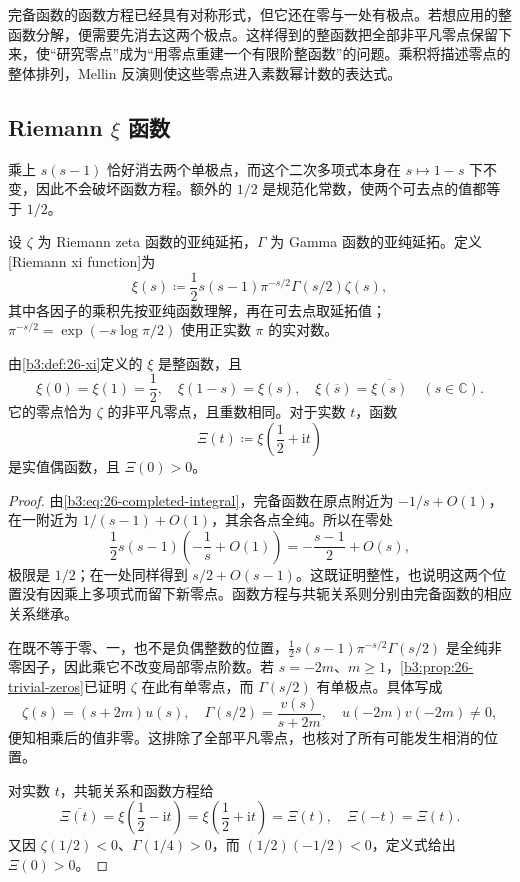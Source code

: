 
完备函数的函数方程已经具有对称形式，但它还在零与一处有极点。若想应用的整函数分解，便需要先消去这两个极点。这样得到的整函数把全部非平凡零点保留下来，使“研究零点”成为“用零点重建一个有限阶整函数”的问题。乘积将描述零点的整体排列，Mellin 反演则使这些零点进入素数幂计数的表达式。

\subsection{Riemann \texorpdfstring{\(\xi\)}{\AnalysisPdfXi} 函数}
\label{b3:subsec:260601}

乘上 \(s(s-1)\) 恰好消去两个单极点，而这个二次多项式本身在 \(s\mapsto1-s\) 下不变，因此不会破坏函数方程。额外的 \(1/2\) 是规范化常数，使两个可去点的值都等于 \(1/2\)。

\begin{definition}[Riemann xi 函数]\label{b3:def:26-xi}
设 \(\zeta\) 为 Riemann zeta 函数的亚纯延拓，\(\Gamma\) 为 Gamma 函数的亚纯延拓。定义[Riemann xi function]为
\[
 \xi(s)\coloneqq\frac12s(s-1)\pi^{-s/2}\Gamma(s/2)\zeta(s),
\]
其中各因子的乘积先按亚纯函数理解，再在可去点取延拓值；\(\pi^{-s/2}=\exp(-s\log\pi/2)\) 使用正实数 \(\pi\) 的实对数。
\end{definition}

\begin{proposition}[整性、对称性与零点]\label{b3:prop:26-xi-properties}
由\cref{b3:def:26-xi}定义的 \(\xi\) 是整函数，且
\[
 \xi(0)=\xi(1)=\frac12,\quad
 \xi(1-s)=\xi(s),\quad
 \xi(\overline s)=\overline{\xi(s)}\quad(s\in\mathbb C).
\]
它的零点恰为 \(\zeta\) 的非平凡零点，且重数相同。对于实数 \(t\)，函数
\[
 \Xi(t)\coloneqq\xi\left(\frac12+\mathrm it\right)
\]
是实值偶函数，且 \(\Xi(0)>0\)。
\end{proposition}
\begin{proof}
由\eqref{b3:eq:26-completed-integral}，完备函数在原点附近为 \(-1/s+O(1)\)，在一附近为 \(1/(s-1)+O(1)\)，其余各点全纯。所以在零处
\[
 \frac12s(s-1)\left(-\frac1s+O(1)\right)
 =-\frac{s-1}{2}+O(s),
\]
极限是 \(1/2\)；在一处同样得到 \(s/2+O(s-1)\)。这既证明整性，也说明这两个位置没有因乘上多项式而留下新零点。函数方程与共轭关系则分别由完备函数的相应关系继承。

在既不等于零、一，也不是负偶整数的位置，\(\tfrac12s(s-1)\pi^{-s/2}\Gamma(s/2)\) 是全纯非零因子，因此乘它不改变局部零点阶数。若 \(s=-2m\)、\(m\ge1\)，\cref{b3:prop:26-trivial-zeros}已证明 \(\zeta\) 在此有单零点，而 \(\Gamma(s/2)\) 有单极点。具体写成
\[
 \zeta(s)=(s+2m)u(s),\quad
 \Gamma(s/2)=\frac{v(s)}{s+2m},\quad
 u(-2m)v(-2m)\ne0,
\]
便知相乘后的值非零。这排除了全部平凡零点，也核对了所有可能发生相消的位置。

对实数 \(t\)，共轭关系和函数方程给
\[
 \overline{\Xi(t)}
 =\xi\left(\frac12-\mathrm it\right)
 =\xi\left(\frac12+\mathrm it\right)=\Xi(t),
 \quad \Xi(-t)=\Xi(t).
\]
又因 \(\zeta(1/2)<0\)、\(\Gamma(1/4)>0\)，而 \((1/2)(-1/2)<0\)，定义式给出 \(\Xi(0)>0\)。
\end{proof}

